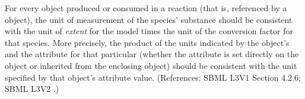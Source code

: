 For every \Species object produced or consumed in a reaction (that is, referenced
by a \SpeciesReference object), the unit of
measurement of the species' substance should be consistent with the unit of 
\emph{extent} for the model times the unit of the conversion
factor for that species.  More precisely, the product of the units indicated by the
\Model object's  and the  attribute for
that particular \Species (whether
the attribute is set directly on the \Species object or inherited from
the enclosing \Model object) should be consistent with the unit specified
by that \Species object's  attribute value.  (References:
SBML L3V1 Section 4.2.6; SBML L3V2 .)
